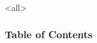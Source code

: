 \documentclass[ngerman, ignorenonframetext]{beamer}
\begin{document}
	\mode<all>
	\begin{frame}
	\maketitle					%
	\end{frame}

	\begin{frame}
		\frametitle{Table of Contents}
		\tableofcontents		%
	\end{frame}	
	
	
	
	
	
	\begin{frame}[allowframebreaks] %
			\nocite{*}
			\printbibliography	%
	\end{frame}
	\mode*
\end{document}
